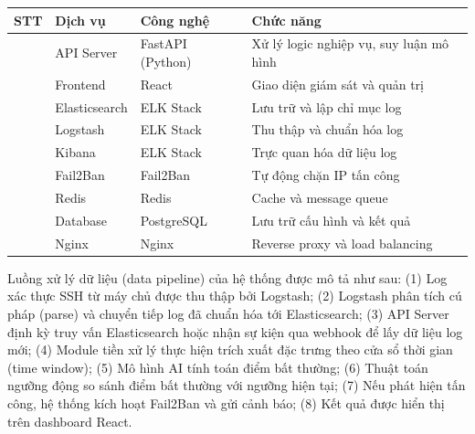 \documentclass[
  a4paper]{report}
\newcounter{none} %
\begin{document}
{\def\LTcaptype{none} %
\begin{longtable}[]{@{}
  >{\raggedright\arraybackslash}p{}
  >{\raggedright\arraybackslash}p{}
  >{\raggedright\arraybackslash}p{}
  >{\raggedright\arraybackslash}p{}@{}}
\toprule\noalign{}
\begin{minipage}[b]{\linewidth}\raggedright
STT
\end{minipage} & \begin{minipage}[b]{\linewidth}\raggedright
Dịch vụ
\end{minipage} & \begin{minipage}[b]{\linewidth}\raggedright
Công nghệ
\end{minipage} & \begin{minipage}[b]{\linewidth}\raggedright
Chức năng
\end{minipage} \\
\midrule\noalign{}
\endhead
\bottomrule\noalign{}
\endlastfoot
1 & API Server & FastAPI (Python) & Xử lý logic nghiệp vụ, suy luận mô
hình \\
2 & Frontend & React & Giao diện giám sát và quản trị \\
3 & Elasticsearch & ELK Stack & Lưu trữ và lập chỉ mục log \\
4 & Logstash & ELK Stack & Thu thập và chuẩn hóa log \\
5 & Kibana & ELK Stack & Trực quan hóa dữ liệu log \\
6 & Fail2Ban & Fail2Ban & Tự động chặn IP tấn công \\
7 & Redis & Redis & Cache và message queue \\
8 & Database & PostgreSQL & Lưu trữ cấu hình và kết quả \\
9 & Nginx & Nginx & Reverse proxy và load balancing \\
\end{longtable}
}

Luồng xử lý dữ liệu (data pipeline) của hệ thống được mô tả như sau: (1)
Log xác thực SSH từ máy chủ được thu thập bởi Logstash; (2) Logstash
phân tích cú pháp (parse) và chuyển tiếp log đã chuẩn hóa tới
Elasticsearch; (3) API Server định kỳ truy vấn Elasticsearch hoặc nhận
sự kiện qua webhook để lấy dữ liệu log mới; (4) Module tiền xử lý thực
hiện trích xuất đặc trưng theo cửa sổ thời gian (time window); (5) Mô
hình AI tính toán điểm bất thường; (6) Thuật toán ngưỡng động so sánh
điểm bất thường với ngưỡng hiện tại; (7) Nếu phát hiện tấn công, hệ
thống kích hoạt Fail2Ban và gửi cảnh báo; (8) Kết quả được hiển thị trên
dashboard React.
\end{document}
